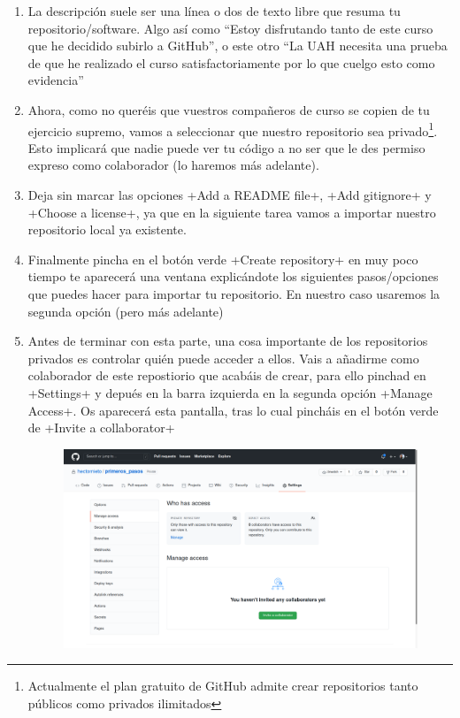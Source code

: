 \documentclass[a4paper,10pt]{article}
\begin{document}
\begin{enumerate}
       \item La descripción suele ser una línea o dos de texto libre que resuma tu repositorio/software. Algo así como ``Estoy disfrutando tanto de este curso que he decidido subirlo a GitHub'', o este otro ``La UAH necesita una prueba de que he realizado el curso satisfactoriamente por lo que cuelgo esto como evidencia''
       
       \item Ahora, como no queréis que vuestros compañeros de curso se copien de tu ejercicio supremo, vamos a seleccionar que nuestro repositorio sea privado\footnote{Actualmente el plan gratuito de GitHub admite crear repositorios tanto públicos como privados ilimitados}. Esto implicará que nadie puede ver tu código a no ser que le des permiso expreso como colaborador (lo haremos más adelante).
       
       
       \item Deja sin marcar las opciones \cverb+Add a README file+, \cverb+Add gitignore+ y \cverb+Choose a license+, ya que en la siguiente tarea vamos a importar nuestro repositorio local ya existente.
       
       \item Finalmente pincha en el botón verde \cverb+Create repository+ en muy poco tiempo te aparecerá una ventana explicándote los siguientes pasos/opciones que puedes hacer para importar tu repositorio. En nuestro caso usaremos la segunda opción (pero más adelante)
       
       \item Antes de terminar con esta parte, una cosa importante de los repositorios privados es controlar quién puede acceder a ellos. Vais a añadirme como colaborador de este repostiorio que acabáis de crear, para ello pinchad en \cverb+Settings+ y depués en la barra izquierda en la segunda opción \cverb+Manage Access+. Os aparecerá esta pantalla, tras lo cual pincháis en el botón verde de \cverb+Invite a collaborator+

       \begin{figure}[H]
        \includegraphics[width=\columnwidth]{github_add_collaborator.png}
       \end{figure}
       

\end{enumerate}
\end{document}
